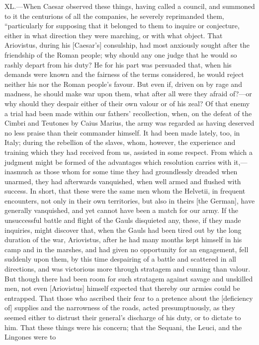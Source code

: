 XL.—When Caesar observed these things, having called a council, and
summoned to it the centurions of all the companies, he severely
reprimanded them, ``particularly for supposing that it belonged to them
to inquire or conjecture, either in what direction they were marching,
or with what object. That Ariovistus, during his [Caesar's] consulship,
had most anxiously sought after the friendship of the Roman people; why
should any one judge that he would so rashly depart from his duty? He
for his part was persuaded that, when his demands were known and the
fairness of the terms considered, he would reject neither his nor the
Roman people's favour. But even if, driven on by rage and madness, he
should make war upon them, what after all were they afraid of?—or why
should they despair either of their own valour or of his zeal? Of that
enemy a trial had been made within our fathers' recollection, when, on
the defeat of the Cimbri and Teutones by Caius Marius, the army was
regarded as having deserved no less praise than their commander himself.
It had been made lately, too, in Italy; during the rebellion of the
slaves, whom, however, the experience and training which they had
received from us, assisted in some respect. From which a judgment might
be formed of the advantages which resolution carries with it,—inasmuch
as those whom for some time they had groundlessly dreaded when unarmed,
they had afterwards vanquished, when well armed and flushed with
success. In short, that these were the same men whom the Helvetii, in
frequent encounters, not only in their own territories, but also in
theirs [the German], have generally vanquished, and yet cannot have been
a match for our army. If the unsuccessful battle and flight of the Gauls
disquieted any, these, if they made inquiries, might discover that, when
the Gauls had been tired out by the long duration of the war,
Ariovistus, after he had many months kept himself in his camp and in the
marshes, and had given no opportunity for an engagement, fell suddenly
upon them, by this time despairing of a battle and scattered in all
directions, and was victorious more through stratagem and cunning than
valour. But though there had been room for such stratagem against savage
and unskilled men, not even [Ariovistus] himself expected that thereby
our armies could be entrapped. That those who ascribed their fear to a
pretence about the [deficiency of] supplies and the narrowness of the
roads, acted presumptuously, as they seemed either to distrust their
general's discharge of his duty, or to dictate to him. That these things
were his concern; that the Sequani, the Leuci, and the Lingones were to

